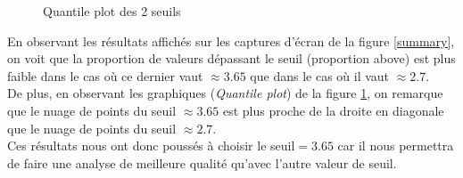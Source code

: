 \documentclass[a4paper,french,10pt]{article}
\begin{document}
\begin{figure}[htp] 
	\centering
	\hfill%
	\caption{Quantile plot des 2 seuils}
	\label{graph}
\end{figure}

En observant les résultats affichés sur les captures d'écran de la figure \ref{summary}, on voit que la proportion de valeurs dépassant le seuil (proportion above) est plus faible dans le cas où ce dernier vaut $\approx 3.65$ que dans le cas où il vaut $\approx 2.7$. \\
De plus, en observant les graphiques (\textit{Quantile plot}) de la figure \ref{graph}, on remarque que le nuage de points du seuil $\approx 3.65$ est plus proche de la droite en diagonale que le nuage de points du seuil $\approx 2.7$. \\
Ces résultats nous ont donc poussés à choisir le seuil$=3.65$ car il nous permettra de faire une analyse de meilleure qualité qu'avec l'autre valeur de seuil.
\end{document}
